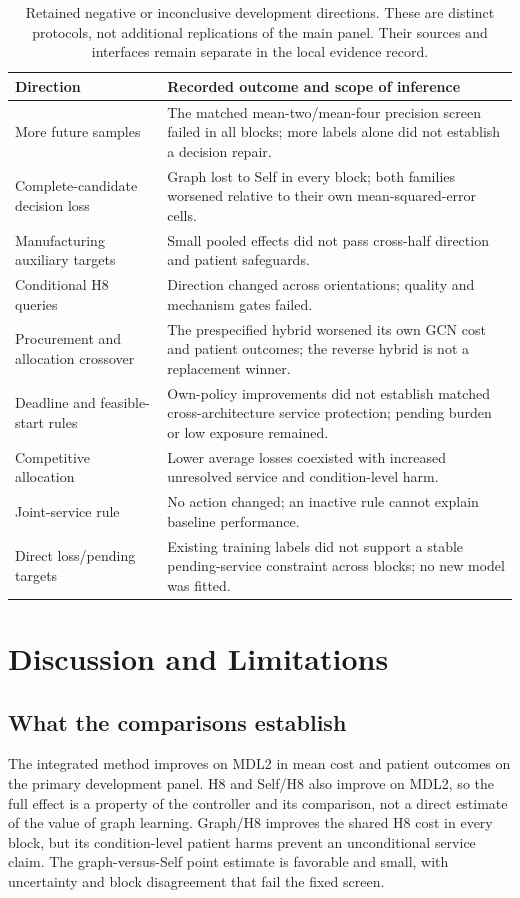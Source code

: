 \documentclass[preprint,12pt]{elsarticle}
\begin{document}
\begin{table}[tbp]
\centering
\caption{Retained negative or inconclusive development directions.
These are distinct protocols, not additional replications of the main panel.
Their sources and interfaces remain separate in the local evidence record.}
\label{tab:negative}
\small
\begin{tabularx}{\textwidth}{>{\raggedright\arraybackslash}p{} >{\raggedright\arraybackslash}X}
\toprule
Direction & Recorded outcome and scope of inference\\
\midrule
More future samples & The matched mean-two/mean-four precision screen failed
in all blocks; more labels alone did not establish a decision repair.\\
Complete-candidate decision loss & Graph lost to Self in every block; both
families worsened relative to their own mean-squared-error cells.\\
Manufacturing auxiliary targets & Small pooled effects did not pass
cross-half direction and patient safeguards.\\
Conditional H8 queries & Direction changed across orientations; quality and
mechanism gates failed.\\
Procurement and allocation crossover & The prespecified hybrid worsened its own
GCN cost and patient outcomes; the reverse hybrid is not a replacement winner.\\
Deadline and feasible-start rules & Own-policy improvements did not establish
matched cross-architecture service protection; pending burden or low exposure
remained.\\
Competitive allocation & Lower average losses coexisted with increased
unresolved service and condition-level harm.\\
Joint-service rule & No action changed; an inactive rule cannot explain
baseline performance.\\
Direct loss/pending targets & Existing training labels did not support a stable
pending-service constraint across blocks; no new model was fitted.\\
\bottomrule
\end{tabularx}
\end{table}

\section{Discussion and Limitations}
\subsection{What the comparisons establish}
The integrated method improves on MDL2 in mean cost and patient outcomes on the
primary development panel. H8 and Self/H8 also improve on MDL2, so the full
effect is a property of the controller and its comparison, not a direct estimate
of the value of graph learning. Graph/H8 improves the shared H8 cost in every
block, but its condition-level patient harms prevent an unconditional service
claim. The graph-versus-Self point estimate is favorable and small, with
uncertainty and block disagreement that fail the fixed screen.
\end{document}
